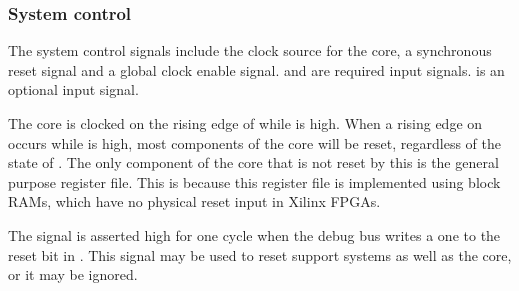 
\subsubsection{System control}
\label{sec:core-ug-cfg-inst-iface-syscon}

The system control signals include the clock source for the core, a synchronous 
reset signal and a global clock enable signal.  and  are 
required  input signals.  is an optional 
 input signal.

The core is clocked on the rising edge of  while  is high. 
When a rising edge on  occurs while  is high, most
components of the core will be reset, regardless of the state of .
The only component of the core that is not reset by this is the general purpose
register file. This is because this register file is implemented using block
RAMs, which have no physical reset input in Xilinx FPGAs.

The  signal is asserted high for one cycle when the debug bus 
writes a one to the reset bit in . This signal may be used to reset 
support systems as well as the core, or it may be ignored.


